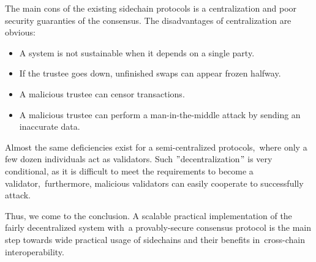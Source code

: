 The main cons of the existing sidechain protocols is a centralization and poor security guaranties of the consensus.
The disadvantages of centralization are obvious:
\begin{itemize}
    \item A system is not sustainable when it depends on a single party.
    \item If the trustee goes down, unfinished swaps can appear frozen halfway.
    \item A malicious trustee can censor transactions.
    \item A malicious trustee can perform a man-in-the-middle attack by sending an inaccurate data.
\end{itemize}
Almost the same deficiencies exist for a semi-centralized protocols,\
where only a few dozen individuals act as validators.
Such \("\)decentralization\("\) is very conditional, as it is difficult to meet the requirements to become a validator,\
furthermore, malicious validators can easily cooperate to successfully attack.

Thus, we come to the conclusion.
A scalable practical implementation of the fairly decentralized system with\
a provably-secure consensus protocol is the main step towards wide practical usage of sidechains and their benefits in\
cross-chain interoperability.
